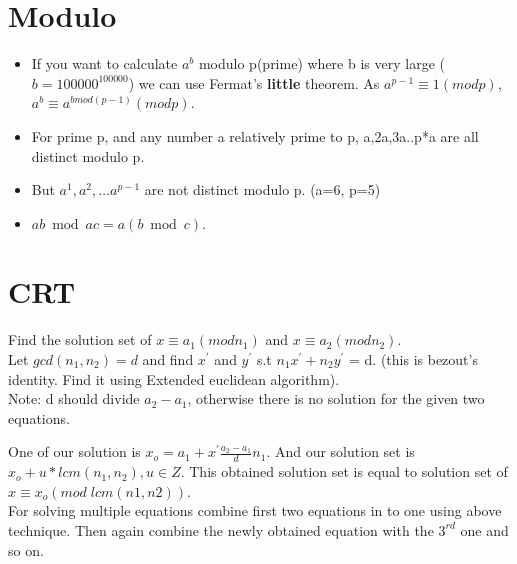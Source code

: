 \documentclass[../Notes.tex]{subfiles}
\begin{document}
\section{Modulo}
\begin{itemize}
	\item If you want to calculate $a^b$ modulo p(prime) where b is very large ($b=100000^{100000}$) we can use Fermat's \textbf{little} theorem. As $a^{p-1}\equiv 1(mod p)$, $a^b\equiv a^{bmod(p-1)}(mod p)$.  
	\item For prime p, and any number a relatively prime to p, a,2a,3a..p*a are all distinct modulo p.
	\item But $a^1,a^2,\dotsc a^{p-1}$ are not distinct modulo p. (a=6, p=5)
	\item $ab \bmod ac = a(b \bmod c)$.
\end{itemize}

\section{CRT}
Find the solution set of $x\equiv a_1(mod n_1)$ and $x\equiv a_2(mod n_2)$.\\

Let $gcd(n_1,n_2)=d$ and find $x^\prime$ and $y^\prime$ s.t $n_1x^\prime + n_2y^\prime$ = d. (this is bezout's identity. Find it using Extended euclidean algorithm).\\
Note: d should divide $a_2-a_1$, otherwise there is no solution for the given two equations.

One of our solution is $x_o=a_1+x^\prime \frac{a_2-a_1}{d}n_1$. And our solution set is \\ $x_o+u*lcm(n_1,n_2), u\in Z$. This obtained solution set is equal to solution set of $x\equiv x_o(mod\;lcm(n1,n2))$.\\

For solving multiple equations combine first two equations in to one using above technique. Then again combine the newly obtained equation with the $3^{rd}$ one and so on.
\end{document}
